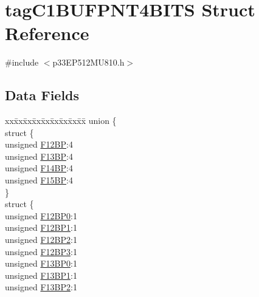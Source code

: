 \hypertarget{structtag_c1_b_u_f_p_n_t4_b_i_t_s}{}\section{tag\+C1\+B\+U\+F\+P\+N\+T4\+B\+I\+TS Struct Reference}
\label{structtag_c1_b_u_f_p_n_t4_b_i_t_s}


{\ttfamily \#include $<$p33\+E\+P512\+M\+U810.\+h$>$}

\subsection*{Data Fields}
\begin{DoxyCompactItemize}
\item 
\begin{tabbing}
xx\=xx\=xx\=xx\=xx\=xx\=xx\=xx\=xx\=\kill
union \{\\
\>struct \{\\
\>\>unsigned \hyperlink{structtag_c1_b_u_f_p_n_t4_b_i_t_s_ad9ddff1645fb1bf9f895271954cee105}{F12BP}:4\\
\>\>unsigned \hyperlink{structtag_c1_b_u_f_p_n_t4_b_i_t_s_a1d3f3c0de6b735e7a30db7e0a63f0199}{F13BP}:4\\
\>\>unsigned \hyperlink{structtag_c1_b_u_f_p_n_t4_b_i_t_s_af5c6bbf85eed696b04f6c46f05cc3815}{F14BP}:4\\
\>\>unsigned \hyperlink{structtag_c1_b_u_f_p_n_t4_b_i_t_s_ae1cc17c8b284c11acdc9aeb18094edb0}{F15BP}:4\\
\>\} \\
\>struct \{\\
\>\>unsigned \hyperlink{structtag_c1_b_u_f_p_n_t4_b_i_t_s_a6ddd8e10455884f29a2c3b95c7851950}{F12BP0}:1\\
\>\>unsigned \hyperlink{structtag_c1_b_u_f_p_n_t4_b_i_t_s_a43c9cf4b4c67e11bb2fd619a00a67a06}{F12BP1}:1\\
\>\>unsigned \hyperlink{structtag_c1_b_u_f_p_n_t4_b_i_t_s_af9be347667f4c90fb10f2c3349c70329}{F12BP2}:1\\
\>\>unsigned \hyperlink{structtag_c1_b_u_f_p_n_t4_b_i_t_s_a2ede2b353cd7d380676c88d0722ed0ec}{F12BP3}:1\\
\>\>unsigned \hyperlink{structtag_c1_b_u_f_p_n_t4_b_i_t_s_adbe0ecb925eacf7133ce0aa9c7da8e0b}{F13BP0}:1\\
\>\>unsigned \hyperlink{structtag_c1_b_u_f_p_n_t4_b_i_t_s_a4ebbfb6ecd1817559d4345358c142f89}{F13BP1}:1\\
\>\>unsigned \hyperlink{structtag_c1_b_u_f_p_n_t4_b_i_t_s_aee8ea24c2cb565ea0d02acbf7dcdc400}{F13BP2}:1\\

\end{tabbing}
\end{DoxyCompactItemize}
